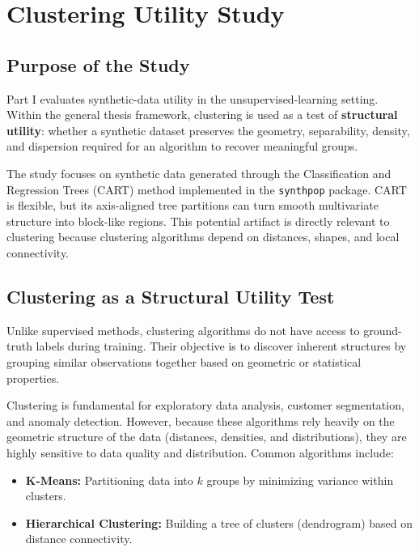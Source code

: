 \chapter{Clustering Utility Study}
\label{chap:clustering-introduction}

\section{Purpose of the Study}
\label{sec:clustering-purpose}

Part I evaluates synthetic-data utility in the unsupervised-learning setting. Within the general thesis framework, clustering is used as a test of \textbf{structural utility}: whether a synthetic dataset preserves the geometry, separability, density, and dispersion required for an algorithm to recover meaningful groups.

The study focuses on synthetic data generated through the Classification and Regression Trees (CART) method implemented in the \texttt{synthpop} package. CART is flexible, but its axis-aligned tree partitions can turn smooth multivariate structure into block-like regions. This potential artifact is directly relevant to clustering because clustering algorithms depend on distances, shapes, and local connectivity.

\section{Clustering as a Structural Utility Test}
\label{sec:clustering-structural-utility}

Unlike supervised methods, clustering algorithms do not have access to ground-truth labels during training. Their objective is to discover inherent structures by grouping similar observations together based on geometric or statistical properties.

Clustering is fundamental for exploratory data analysis, customer segmentation, and anomaly detection. However, because these algorithms rely heavily on the geometric structure of the data (distances, densities, and distributions), they are highly sensitive to data quality and distribution. Common algorithms include:
\begin{itemize}
  \item \textbf{K-Means:} Partitioning data into $k$ groups by minimizing variance within clusters.
  \item \textbf{Hierarchical Clustering:} Building a tree of clusters (dendrogram) based on distance connectivity.
\end{itemize}

